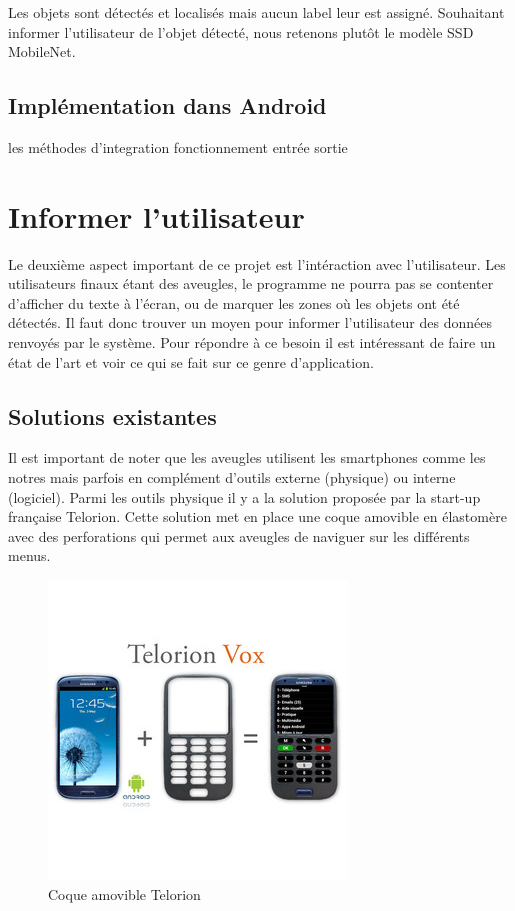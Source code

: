 \documentclass[UTF8]{EPURapport}
\begin{document}
Les objets sont détectés et localisés mais aucun label leur est assigné. Souhaitant informer l'utilisateur de l'objet détecté, nous retenons plutôt le modèle SSD MobileNet.
\subsection{Implémentation dans Android}
les méthodes d'integration
fonctionnement
entrée sortie

\section{Informer l'utilisateur}
Le deuxième aspect important de ce projet est l'intéraction avec l'utilisateur. Les utilisateurs finaux étant des aveugles, le programme ne pourra pas se contenter d'afficher du texte à l'écran, ou de marquer les zones où les objets ont été détectés. Il faut donc trouver un moyen pour informer l'utilisateur des données renvoyés par le système. Pour répondre à ce besoin il est intéressant de faire un état de l'art et voir ce qui se fait sur ce genre d'application.

\subsection{Solutions existantes}
Il est important de noter que les aveugles utilisent les smartphones comme les notres mais parfois en complément d'outils externe (physique) ou interne (logiciel). Parmi les outils physique il y a la solution proposée par la start-up française Telorion. Cette solution met en place une coque amovible en élastomère avec des perforations qui permet aux aveugles de naviguer sur les différents menus.

\begin{figure}[h!]
\centering
  \includegraphics[width=\textwidth]{images/telorion_case.JPG}
  \caption{Coque amovible Telorion}
  \label{fig:telorioncase}
\end{figure}
\end{document}
